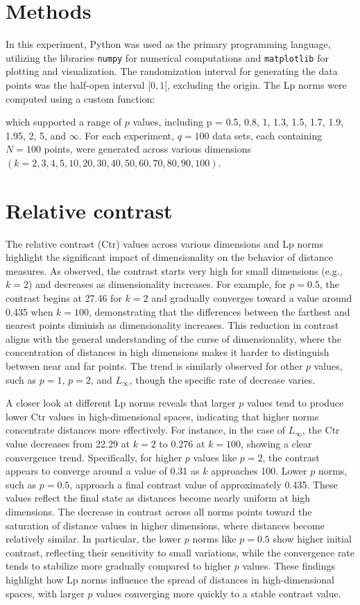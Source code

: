 \documentclass{article}
\begin{document}
\section{Methods}
In this experiment, Python was used as the primary programming language, utilizing the libraries \texttt{numpy} for numerical computations and \texttt{matplotlib} for plotting and visualization. The randomization interval for generating the data points was the half-open interval \([0,1[\), excluding the origin. The Lp norms were computed using a custom function:



which supported a range of \(p\) values, including p = 0.5, 0.8, 1, 1.3, 1.5, 1.7, 1.9, 1.95, 2, 5, and \(\infty\). For each experiment, \(q = 100\) data sets, each containing \(N = 100\) points, were generated across various dimensions \((k = 2, 3, 4, 5, 10, 20, 30, 40, 50, 60, 70, 80, 90, 100)\).

\section{\textbf{Relative contrast}}
The relative contrast (Ctr) values across various dimensions and Lp norms highlight the significant impact of dimensionality on the behavior of distance measures. As observed, the contrast starts very high for small dimensions (e.g., $k=2$) and decreases as dimensionality increases. For example, for $p=0.5$, the contrast begins at 27.46 for $k=2$ and gradually converges toward a value around 0.435 when $k=100$, demonstrating that the differences between the farthest and nearest points diminish as dimensionality increases. This reduction in contrast aligns with the general understanding of the curse of dimensionality, where the concentration of distances in high dimensions makes it harder to distinguish between near and far points. The trend is similarly observed for other $p$ values, such as $p=1$, $p=2$, and $L_{\infty}$, though the specific rate of decrease varies.

A closer look at different Lp norms reveals that larger $p$ values tend to produce lower Ctr values in high-dimensional spaces, indicating that higher norms concentrate distances more effectively. For instance, in the case of $L_{\infty}$, the Ctr value decreases from 22.29 at $k=2$ to 0.276 at $k=100$, showing a clear convergence trend. Specifically, for higher $p$ values like $p=2$, the contrast appears to converge around a value of 0.31 as $k$ approaches 100. Lower $p$ norms, such as $p=0.5$, approach a final contrast value of approximately 0.435. These values reflect the final state as distances become nearly uniform at high dimensions. The decrease in contrast across all norms points toward the saturation of distance values in higher dimensions, where distances become relatively similar. In particular, the lower $p$ norms like $p=0.5$ show higher initial contrast, reflecting their sensitivity to small variations, while the convergence rate tends to stabilize more gradually compared to higher $p$ values. These findings highlight how Lp norms influence the spread of distances in high-dimensional spaces, with larger $p$ values converging more quickly to a stable contrast value.
\end{document}
